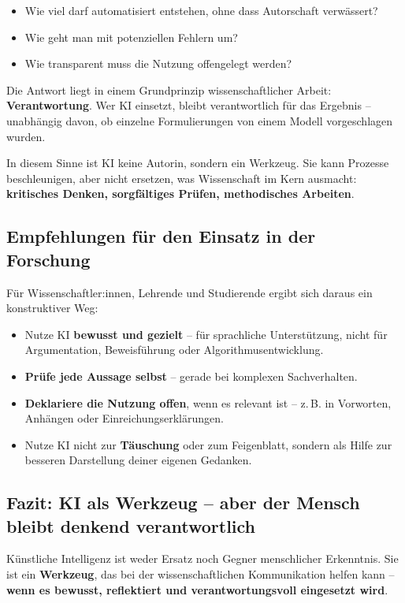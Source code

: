 \begin{itemize}
	\item Wie viel darf automatisiert entstehen, ohne dass Autorschaft verwässert?
	\item Wie geht man mit potenziellen Fehlern um?
	\item Wie transparent muss die Nutzung offengelegt werden?
\end{itemize}

Die Antwort liegt in einem Grundprinzip wissenschaftlicher Arbeit: \textbf{Verantwortung}. Wer KI einsetzt, bleibt verantwortlich für das Ergebnis – unabhängig davon, ob einzelne Formulierungen von einem Modell vorgeschlagen wurden.

In diesem Sinne ist KI keine Autorin, sondern ein Werkzeug. Sie kann Prozesse beschleunigen, aber nicht ersetzen, was Wissenschaft im Kern ausmacht: \textbf{kritisches Denken, sorgfältiges Prüfen, methodisches Arbeiten}.

\subsection*{Empfehlungen für den Einsatz in der Forschung}
Für Wissenschaftler:innen, Lehrende und Studierende ergibt sich daraus ein konstruktiver Weg:

\begin{itemize}
	\item Nutze KI \textbf{bewusst und gezielt} – für sprachliche Unterstützung, nicht für Argumentation, Beweisführung oder Algorithmusentwicklung.
	\item \textbf{Prüfe jede Aussage selbst} – gerade bei komplexen Sachverhalten.
	\item \textbf{Deklariere die Nutzung offen}, wenn es relevant ist – z.\,B. in Vorworten, Anhängen oder Einreichungserklärungen.
	\item Nutze KI nicht zur \textbf{Täuschung} oder zum Feigenblatt, sondern als Hilfe zur besseren Darstellung deiner eigenen Gedanken.
\end{itemize}

\subsection*{Fazit: KI als Werkzeug – aber der Mensch bleibt denkend verantwortlich}
Künstliche Intelligenz ist weder Ersatz noch Gegner menschlicher Erkenntnis. Sie ist ein \textbf{Werkzeug}, das bei der wissenschaftlichen Kommunikation helfen kann – \textbf{wenn es bewusst, reflektiert und verantwortungsvoll eingesetzt wird}.

